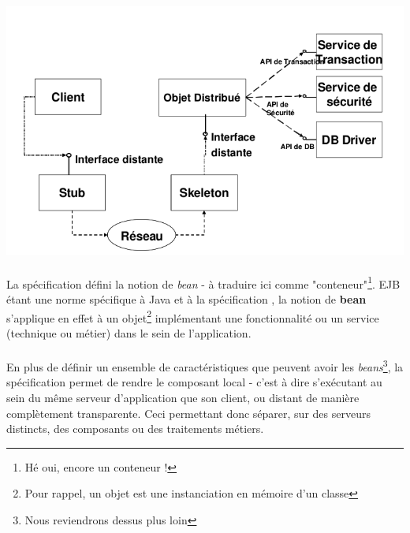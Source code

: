 {   \begin{center}
     \includegraphics[scale=0.3]{img/ejb-overview.png}
   \end{center}

   \paragraph{} La spécification défini la notion de \textit{bean} - à traduire ici comme
   "conteneur"\footnote{Hé oui, encore un conteneur !}. EJB étant une norme spécifique à Java et à
   la spécification , la    notion de \textbf{bean} s'applique en effet à un
   objet\footnote{Pour rappel, un objet est une instanciation en mémoire d'un classe} implémentant une
   fonctionnalité ou un service (technique ou métier) dans le sein de l'application.

   \paragraph{} En plus de définir un ensemble de caractéristiques que peuvent avoir les
   \textit{beans}\footnote{Nous reviendrons dessus plus loin}, la spécification permet de rendre le
   composant local - c'est à dire s'exécutant au sein du même serveur d'application que son client,
   ou distant de manière complètement transparente. Ceci permettant donc séparer, sur des serveurs
   distincts, des composants ou des traitements métiers.

}
